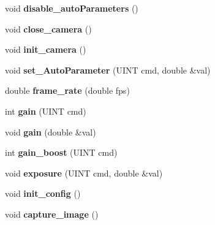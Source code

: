 \begin{DoxyCompactItemize}
\item 
\hypertarget{classCamera_a260fe77dd5b9381c07e0c5b19b58ba71}{void {\bfseries disable\-\_\-auto\-Parameters} ()}\label{classCamera_a260fe77dd5b9381c07e0c5b19b58ba71}

\item 
\hypertarget{classCamera_a2eb2e16c991848d5f556ff9a4c297a66}{void {\bfseries close\-\_\-camera} ()}\label{classCamera_a2eb2e16c991848d5f556ff9a4c297a66}

\item 
\hypertarget{classCamera_ad24264a56f7dbef2ddd202b65e8a8cde}{void {\bfseries init\-\_\-camera} ()}\label{classCamera_ad24264a56f7dbef2ddd202b65e8a8cde}

\item 
\hypertarget{classCamera_a14f056cbef5d626b0ad17f1b0a84e139}{void {\bfseries set\-\_\-\-Auto\-Parameter} (U\-I\-N\-T cmd, double \&val)}\label{classCamera_a14f056cbef5d626b0ad17f1b0a84e139}

\item 
\hypertarget{classCamera_ae6316b4da0fd2e0daaf85cfa980a82a2}{double {\bfseries frame\-\_\-rate} (double fps)}\label{classCamera_ae6316b4da0fd2e0daaf85cfa980a82a2}

\item 
\hypertarget{classCamera_afa909bbdf600871c288ff607ca4877e6}{int {\bfseries gain} (U\-I\-N\-T cmd)}\label{classCamera_afa909bbdf600871c288ff607ca4877e6}

\item 
\hypertarget{classCamera_a685e24b45a50a32a5acd7119ac14cb86}{void {\bfseries gain} (double \&val)}\label{classCamera_a685e24b45a50a32a5acd7119ac14cb86}

\item 
\hypertarget{classCamera_a5745bbcaf0aff62ade2c6d952803c48b}{int {\bfseries gain\-\_\-boost} (U\-I\-N\-T cmd)}\label{classCamera_a5745bbcaf0aff62ade2c6d952803c48b}

\item 
\hypertarget{classCamera_a48381812a08a83b2af145e1ff7becb4c}{void {\bfseries exposure} (U\-I\-N\-T cmd, double \&val)}\label{classCamera_a48381812a08a83b2af145e1ff7becb4c}

\item 
\hypertarget{classCamera_af318991ff88175df0ca94a9e2969af2a}{void {\bfseries init\-\_\-config} ()}\label{classCamera_af318991ff88175df0ca94a9e2969af2a}

\item 
\hypertarget{classCamera_aa735729e2c164e0ca18007929cc62df8}{void {\bfseries capture\-\_\-image} ()}\label{classCamera_aa735729e2c164e0ca18007929cc62df8}


\end{DoxyCompactItemize}
